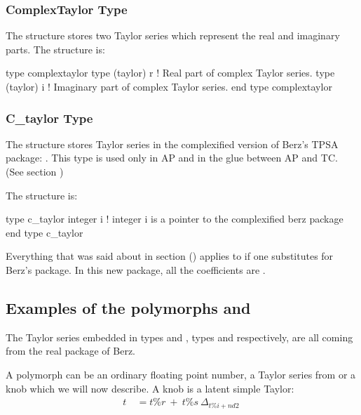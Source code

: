 \documentclass{hitec}     %
\begin{document}
{{%
\subsubsection{ComplexTaylor Type}
\label{s:taylor}

The  structure stores two Taylor series which represent the real and imaginary parts.
The structure is:
\begin{code}
type complextaylor
   type (taylor) r     ! Real part of complex Taylor series.
   type (taylor) i     ! Imaginary part of complex Taylor series.
end type complextaylor
\end{code}

 \subsubsection{C_taylor Type}
\label{s:ctaylor}

The  structure stores  Taylor series in the complexified version of Berz's TPSA package: . This type is used only in AP and in the glue between AP and TC. (See section  )

The structure is:
\begin{code}
type c_taylor
 integer i ! integer i is a pointer to the complexified berz package
end type c_taylor
\end{code}   

Everything that was said about  in section () applies to  if one substitutes  for Berz's package. In this new package, all the coefficients are .

 \subsection{Examples of the polymorphs    and   }\label{s:rc8}
  
 The Taylor series embedded in types  and , types  and  respectively, are all coming from the real package  of Berz. 
 
 A  polymorph can be an ordinary floating point number, a Taylor series from   or a knob which we will now describe. A knob is a latent  simple Taylor:
\begin{align} t\ &= t\%r\ +\ t\%s\ {\Delta }_{t\%i+nd2}~\label{eq:knobdef} \end{align}


}}
\end{document}
